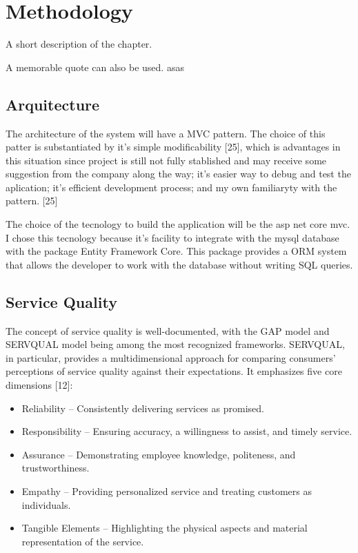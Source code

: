 \chapter{Methodology}%
\label{chapter:methodology}

\begin{introduction}
A short description of the chapter.

A memorable quote can also be used. asas
\end{introduction} 


\section{Arquitecture}

The architecture of the system will have a MVC pattern. 
The choice of this patter is substantiated by it's simple modificability [25], which is advantages in this situation since project is still not fully stablished and may receive some suggestion from the company along the way;
it's easier way to debug and test the aplication; it's efficient development process; and my own familiaryty with the pattern. [25]

The choice of the tecnology to build the application will be the asp net core mvc. 
I chose this tecnology because it's facility to integrate with the mysql database with the package Entity Framework Core. 
This package provides a \ac{ORM} system that allows the developer to work with the database without writing SQL queries. 

\section{Service Quality}
The concept of service quality is well-documented, with the GAP model and SERVQUAL model being among the most recognized frameworks. SERVQUAL, in particular, provides a multidimensional approach for comparing consumers’ perceptions of service quality against their expectations. It emphasizes five core dimensions [12]:

\begin{itemize}
    \item Reliability – Consistently delivering services as promised.
    \item Responsibility – Ensuring accuracy, a willingness to assist, and timely service.
    \item Assurance – Demonstrating employee knowledge, politeness, and trustworthiness.
    \item Empathy – Providing personalized service and treating customers as individuals.
    \item Tangible Elements – Highlighting the physical aspects and material representation of the service.
  \end{itemize}

